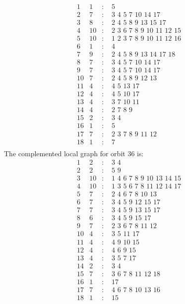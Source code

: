 \documentclass[12pt]{article}
\begin{document}
\begin{equation*}
\begin{array}{rrcl}
1&1&:&\,\,5\\
2&7&:&\,\,3\,\,4\,\,5\,\,7\,\,10\,\,14\,\,17\\
3&8&:&\,\,2\,\,4\,\,5\,\,8\,\,9\,\,13\,\,15\,\,17\\
4&10&:&\,\,2\,\,3\,\,6\,\,7\,\,8\,\,9\,\,10\,\,11\,\,12\,\,15\\
5&10&:&\,\,1\,\,2\,\,3\,\,7\,\,8\,\,9\,\,10\,\,11\,\,12\,\,16\\
6&1&:&\,\,4\\
7&9&:&\,\,2\,\,4\,\,5\,\,8\,\,9\,\,13\,\,14\,\,17\,\,18\\
8&7&:&\,\,3\,\,4\,\,5\,\,7\,\,10\,\,14\,\,17\\
9&7&:&\,\,3\,\,4\,\,5\,\,7\,\,10\,\,14\,\,17\\
10&7&:&\,\,2\,\,4\,\,5\,\,8\,\,9\,\,12\,\,13\\
11&4&:&\,\,4\,\,5\,\,13\,\,17\\
12&4&:&\,\,4\,\,5\,\,10\,\,17\\
13&4&:&\,\,3\,\,7\,\,10\,\,11\\
14&4&:&\,\,2\,\,7\,\,8\,\,9\\
15&2&:&\,\,3\,\,4\\
16&1&:&\,\,5\\
17&7&:&\,\,2\,\,3\,\,7\,\,8\,\,9\,\,11\,\,12\\
18&1&:&\,\,7\\
\end{array}
\end{equation*}
The complemented local graph for orbit $36$ is:
\begin{equation*}
\begin{array}{rrcl}
1&2&:&\,\,3\,\,4\\
2&2&:&\,\,5\,\,9\\
3&10&:&\,\,1\,\,4\,\,6\,\,7\,\,8\,\,9\,\,10\,\,13\,\,14\,\,15\\
4&10&:&\,\,1\,\,3\,\,5\,\,6\,\,7\,\,8\,\,11\,\,12\,\,14\,\,17\\
5&7&:&\,\,2\,\,4\,\,6\,\,7\,\,8\,\,10\,\,13\\
6&7&:&\,\,3\,\,4\,\,5\,\,9\,\,12\,\,15\,\,17\\
7&7&:&\,\,3\,\,4\,\,5\,\,9\,\,13\,\,15\,\,17\\
8&6&:&\,\,3\,\,4\,\,5\,\,9\,\,15\,\,17\\
9&7&:&\,\,2\,\,3\,\,6\,\,7\,\,8\,\,11\,\,12\\
10&4&:&\,\,3\,\,5\,\,11\,\,17\\
11&4&:&\,\,4\,\,9\,\,10\,\,15\\
12&4&:&\,\,4\,\,6\,\,9\,\,15\\
13&4&:&\,\,3\,\,5\,\,7\,\,17\\
14&2&:&\,\,3\,\,4\\
15&7&:&\,\,3\,\,6\,\,7\,\,8\,\,11\,\,12\,\,18\\
16&1&:&\,\,17\\
17&7&:&\,\,4\,\,6\,\,7\,\,8\,\,10\,\,13\,\,16\\
18&1&:&\,\,15\\
\end{array}
\end{equation*}
\end{document}
